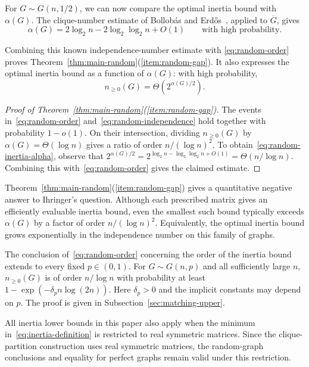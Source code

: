 \documentclass[11pt]{article}
\numberwithin{equation}{section}
\theoremstyle{definition}
\theoremstyle{remark}
\begin{document}
For $G\sim G(n,1/2)$, we can now compare the optimal inertia bound
with $\alpha(G)$. The clique-number estimate of Bollob\'as and
Erd\H{o}s~\cite{BollobasErdos}, applied to $\overline G$, gives
\begin{equation}\label{eq:random-independence}
 \alpha(G)=2\log_2 n-2\log_2\log_2 n+O(1)
 \qquad\text{with high probability}.
\end{equation}

Combining this known independence-number estimate with
\eqref{eq:random-order} proves Theorem~\ref{thm:main-random}(\ref{item:random-gap}).
It also expresses the optimal inertia bound as a function of
$\alpha(G)$: with high probability,
\begin{equation}\label{eq:random-inertia-alpha}
 n_{\geq0}(G)=\Theta\!\left(2^{\alpha(G)/2}\right).
\end{equation}

\begin{proof}[Proof of Theorem~\ref{thm:main-random}(\ref{item:random-gap})]
The events in~\eqref{eq:random-order}
and~\eqref{eq:random-independence} hold together with probability
$1-o(1)$. On their intersection, dividing $n_{\geq0}(G)$ by
$\alpha(G)=\Theta(\log n)$ gives a ratio of order $n/(\log n)^2$.
To obtain~\eqref{eq:random-inertia-alpha}, observe that
$2^{\alpha(G)/2}=2^{\log_2 n-\log_2\log_2 n+O(1)}
=\Theta(n/\log n)$.
Combining this with~\eqref{eq:random-order} gives the claimed estimate.
\end{proof}

Theorem~\ref{thm:main-random}(\ref{item:random-gap}) gives a quantitative
negative answer to Ihringer's question. Although each prescribed
matrix gives an efficiently evaluable inertia bound, even the
smallest such bound typically exceeds $\alpha(G)$ by a factor of order
$n/(\log n)^2$. Equivalently, the optimal inertia bound grows
exponentially in the independence number on this family of graphs.

The conclusion of~\eqref{eq:random-order} concerning the order of
the inertia bound extends to every fixed $p\in(0,1)$.
For $G\sim G(n,p)$ and all sufficiently large $n$, $n_{\geq0}(G)$ is of order
$n/\log n$ with probability at least $1-\exp(-\delta_p n\log(2n))$.
Here $\delta_p>0$ and the implicit constants may depend on $p$.
The proof is given in Subsection~\ref{sec:matching-upper}.

All inertia lower bounds in this paper also apply when the minimum
in~\eqref{eq:inertia-definition} is restricted to real symmetric matrices.
Since the clique-partition construction uses real symmetric matrices,
the random-graph conclusions and equality for perfect graphs remain
valid under this restriction.
\end{document}
